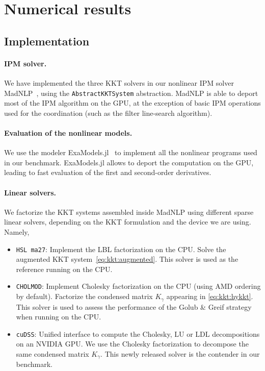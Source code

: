 \section{Numerical results}

\subsection{Implementation}

\paragraph{IPM solver.}
We have implemented the three KKT solvers in our nonlinear IPM solver
MadNLP~\cite{shin2021graph}, using the {\tt AbstractKKTSystem} abstraction.
MadNLP is able to deport most of the IPM algorithm on the GPU,
at the exception of basic IPM operations used for the coordination
(such as the filter line-search algorithm).

\paragraph{Evaluation of the nonlinear models.}
We use the modeler ExaModels.jl~\cite{shin2023accelerating}
to implement all the nonlinear programs used in our benchmark.
ExaModels.jl allows to deport the computation on the GPU, leading
to fast evaluation of the first and second-order derivatives.

\paragraph{Linear solvers.}
We factorize the KKT systems assembled inside MadNLP
using different sparse linear solvers, depending on the KKT formulation
and the device we are using. Namely,
\begin{itemize}
  \item {\tt HSL ma27}: Implement the LBL factorization
    on the CPU. Solve the augmented KKT system~\eqref{eq:kkt:augmented}.
    This solver is used as the reference running on the CPU.
  \item {\tt CHOLMOD}: Implement Cholesky factorization on the CPU
    (using AMD ordering by default). Factorize the condensed
    matrix $K_\gamma$ appearing in \eqref{eq:kkt:hykkt}.
    This solver is used to assess the performance of the
    Golub \& Greif strategy when running on the CPU.
  \item {\tt cuDSS}: Unified interface to compute the Cholesky,
    LU or LDL decompositions on an NVIDIA GPU. We use the Cholesky
    factorization to decompose the same condensed matrix $K_\gamma$.
    This newly released solver is the contender in our benchmark.
\end{itemize}

